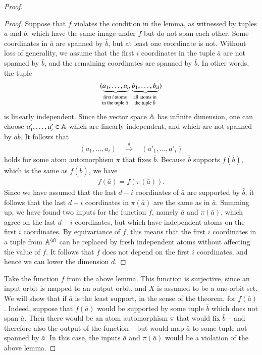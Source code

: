 \begin{proof}
\begin{proof}
	Suppose that $f$ violates the condition in the lemma, as witnessed by tuples $\bar a$ and $\bar b$,
 which have the same image under $f$ but do not span each other. Some coordinates in $\bar a$ are spanned by $\bar b$, but at least one coordinate is not.  Without loss of generality, we assume that the first $i$ coordinates in the tuple $\bar a$ are not spanned by $\bar b$, and the remaining coordinates are spanned by $\bar b$. In other words, the tuple
		\begin{align*}
			(\myunderbrace{a_1,\ldots,a_i}{first $i$ atoms \\ in the tuple $\bar a$}, 
			\myunderbrace{b_1,\ldots,b_d}{all atoms in\\ the tuple $\bar b$})
		\end{align*}
is linearly independent. Since the vector space $\mathbb A$ has infinite dimension, one can choose $a'_1,\ldots,a'_i \in \mathbb A$ which are linearly independent, and which are not spanned by $\bar a \bar b$. It follows that 
\begin{align*}
(a_1,\ldots,a_i) 
\quad \stackrel \pi \mapsto \quad 
(a'_1,\ldots,a'_i)
\end{align*}
holds for some atom automorphism $\pi$ that fixes $\bar b$. Because $\bar b$ supports $f(\bar b)$, which is the same as $f(\bar b)$, we have 
\begin{align*}
	f(\bar a) = f(\pi(\bar a)).
	\end{align*}
Since we have assumed that the  last $d-i$ coordinates of $\bar a$ are  supported by $\bar b$, it follows that the last $d-i$ coordinates in $\pi(\bar a)$ are the same as in $\bar a$. Summing up, we have found two inputs for the function $f$, namely $\bar a$ and $\pi(\bar a)$, which agree on the last $d-i$ coordinates, but which have independent atoms on the first $i$ coordinates. 
By equivariance of $f$, this means that the first $i$ coordinates in a tuple from $\mathbb A^{\langle d \rangle}$ can be replaced by fresh independent atoms without affecting the value of $f$. It follows that $f$ does not depend on the first $i$ coordinates, and hence we can lower the dimension $d$.
\end{proof}

Take the function $f$ from the above lemma. This function is surjective, since an input orbit is mapped to an output orbit, and $X$ is assumed to be a one-orbit set. We will show that if $\bar a$ is the least support, in the sense of the theorem, for $f(\bar a)$. Indeed, suppose that $f(\bar a)$ would be supported by some tuple $\bar b$ which does not span $\bar a$. Then there would be an atom automorphism $\pi$ that would fix $\bar b$ -- and therefore also the output of the function -- but would map $\bar a$ to some tuple not spanned by $\bar a$. In this case, the inputs $\bar a$ and $\pi(\bar a)$ would be a violation of the above lemma.
	\end{proof}

